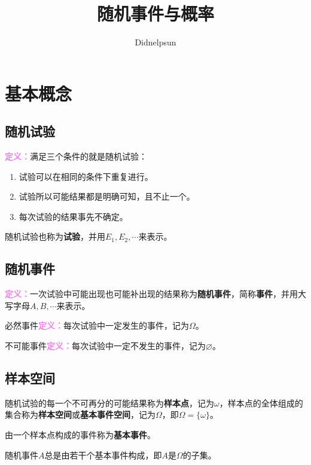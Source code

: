 \documentclass[UTF8, 12pt]{ctexart}
\author{Didnelpsun}
\title{随机事件与概率}
\date{}
\begin{document}
\maketitle
\pagestyle{empty}
\thispagestyle{empty}
\tableofcontents
\thispagestyle{empty}
\newpage
\pagestyle{plain}
\setcounter{page}{1}
\section{基本概念}

\subsection{随机试验}

\textcolor{violet}{\textbf{定义：}}满足三个条件的就是随机试验：

\begin{enumerate}
    \item 试验可以在相同的条件下重复进行。
    \item 试验所以可能结果都是明确可知，且不止一个。
    \item 每次试验的结果事先不确定。
\end{enumerate}

随机试验也称为\textbf{试验}，并用$E_1,E_2,\cdots$来表示。

\subsection{随机事件}

\textcolor{violet}{\textbf{定义：}}一次试验中可能出现也可能补出现的结果称为\textbf{随机事件}，简称\textbf{事件}，并用大写字母$A,B,\cdots$来表示。

必然事件\textcolor{violet}{\textbf{定义：}}每次试验中一定发生的事件，记为$\Omega$。

不可能事件\textcolor{violet}{\textbf{定义：}}每次试验中一定不发生的事件，记为$\varnothing$。

\subsection{样本空间}

随机试验的每一个不可再分的可能结果称为\textbf{样本点}，记为$\omega$，样本点的全体组成的集合称为\textbf{样本空间}或\textbf{基本事件空间}，记为$\Omega$，即$\Omega=\{\omega\}$。

由一个样本点构成的事件称为\textbf{基本事件}。

随机事件$A$总是由若干个基本事件构成，即$A$是$\Omega$的子集。
\end{document}
